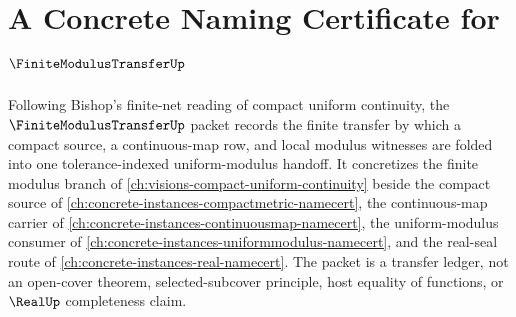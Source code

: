 \chapter{A Concrete Naming Certificate for $\FiniteModulusTransferUp$}
\label{ch:concrete-instances-finite-modulus-transfer-namecert}

Following Bishop's finite-net reading of compact uniform continuity, the $\FiniteModulusTransferUp$ packet records the finite transfer by which a compact source, a continuous-map row, and local modulus witnesses are folded into one tolerance-indexed uniform-modulus handoff. It concretizes the finite modulus branch of \autoref{ch:visions-compact-uniform-continuity} beside the compact source of \autoref{ch:concrete-instances-compactmetric-namecert}, the continuous-map carrier of \autoref{ch:concrete-instances-continuousmap-namecert}, the uniform-modulus consumer of \autoref{ch:concrete-instances-uniformmodulus-namecert}, and the real-seal route of \autoref{ch:concrete-instances-real-namecert}. The packet is a transfer ledger, not an open-cover theorem, selected-subcover principle, host equality of functions, or $\RealUp$ completeness claim.

